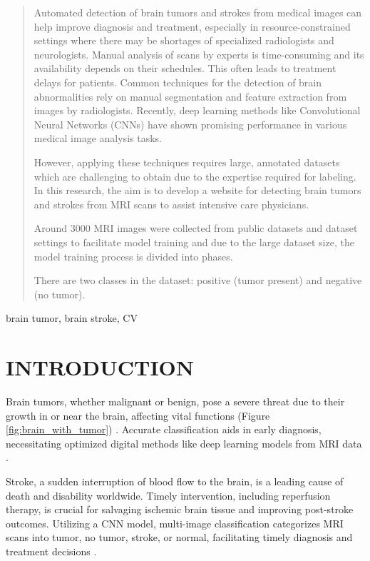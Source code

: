 \documentclass[conference]{IEEEtran}
\begin{document}
\begin{abstract}

Automated detection of brain tumors and strokes from medical images can help improve diagnosis and treatment, 
especially in resource-constrained settings where there may be shortages of specialized radiologists and neurologists.
Manual analysis of scans by experts is time-consuming and its availability depends on their schedules. This often leads to treatment delays for patients. 
Common techniques for the detection of brain abnormalities rely on manual segmentation and feature extraction from images by radiologists.
Recently, deep learning methods like Convolutional Neural Networks (CNNs) have shown promising performance in various medical image analysis tasks.

However, applying these techniques requires large, annotated datasets which are challenging to obtain due to the expertise required for labeling.
In this research, the aim is to develop a website for detecting brain tumors and strokes from MRI scans to assist intensive care physicians.

Around 3000 MRI images were collected from public datasets and dataset settings to facilitate model training and due to the large dataset size, the model training process is divided into phases. 

There are two classes in the dataset: positive (tumor present) and negative (no tumor).

\end{abstract}

\begin{IEEEkeywords}
brain tumor, brain stroke, CV
\end{IEEEkeywords}


\section{INTRODUCTION}

Brain tumors, whether malignant or benign, pose a severe threat due to their growth in or near the brain, affecting vital functions (Figure \ref{fig:brain_with_tumor}) \cite{br35h}.
Accurate classification aids in early diagnosis, necessitating optimized digital methods like deep learning models from MRI data \cite{bioengineering9120783}.

Stroke, a sudden interruption of blood flow to the brain, is a leading cause of death and disability worldwide. 
Timely intervention, including reperfusion therapy, is crucial for salvaging ischemic brain tissue and improving post-stroke outcomes.
Utilizing a CNN model, multi-image classification categorizes MRI scans into tumor, no tumor, stroke, or normal, facilitating timely diagnosis and treatment decisions \cite{huggingface_data, ding2021repvgg}.
\end{document}
